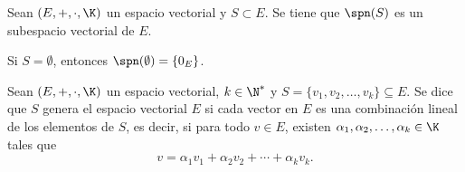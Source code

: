 \documentclass[compacto,10pt]{pubciencias-notas}
\begin{document}
\begin{teo}
Sean $(E,+,\cdot,\K)$ un espacio vectorial y $S\subset E$. Se tiene que $\spn(S)$ es un subespacio vectorial de $E$.
\end{teo}

\begin{obs}
    Si $S = \emptyset$, entonces
    $\spn(\emptyset) = \{ 0_{E} \}$.
\end{obs}


\begin{defi} 
Sean $(E,+,\cdot,\K)$ un espacio vectorial, $k\in\N^{*}$ y $S=\{v_1,v_2,\ldots,v_k\}\subseteq E$. 
Se dice que $S$ genera el espacio vectorial $E$ si cada vector en $E$ es una combinación lineal de los 
elementos de $S$, es decir, si para todo $v\in E$, existen  $\alpha_1, \alpha_2, \ldots, \alpha_k\in \K$ 
tales que 
    \[
        v = \alpha_1v_1+ \alpha_2v_2+ \cdots+ \alpha_k v_k.
    \]
\end{defi}
\end{document}
